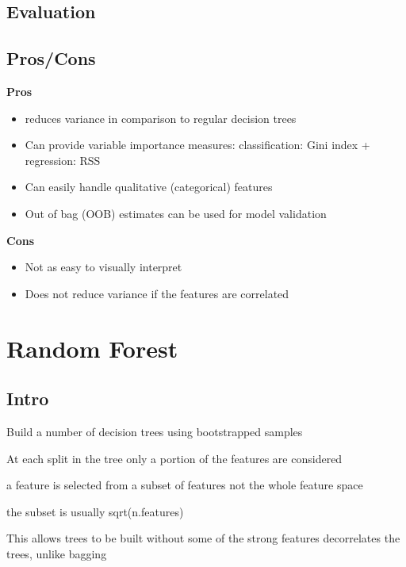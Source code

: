 \documentclass[]{book}
\begin{document}
\hypertarget{evaluation-6}{%
\subsection{Evaluation}\label{evaluation-6}}

\hypertarget{proscons-6}{%
\subsection{Pros/Cons}\label{proscons-6}}

\textbf{Pros}

\begin{itemize}
\item
  reduces variance in comparison to regular decision trees
\item
  Can provide variable importance measures: classification: Gini index + regression: RSS
\item
  Can easily handle qualitative (categorical) features
\item
  Out of bag (OOB) estimates can be used for model validation
\end{itemize}

\textbf{Cons}

\begin{itemize}
\item
  Not as easy to visually interpret
\item
  Does not reduce variance if the features are correlated
\end{itemize}

\hypertarget{random-forest}{%
\section{Random Forest}\label{random-forest}}

\hypertarget{intro-7}{%
\subsection{Intro}\label{intro-7}}

Build a number of decision trees using bootstrapped samples

At each split in the tree only a portion of the features are considered

a feature is selected from a subset of features not the whole feature space

the subset is usually sqrt(n.features)

This allows trees to be built without some of the strong features decorrelates the trees, unlike bagging
\end{document}
